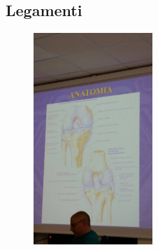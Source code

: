 \subsection{Legamenti}

\begin{figure}[!ht]
\centering
\includegraphics[width=0.4\textwidth]{008/image1.jpeg}
\end{figure}

